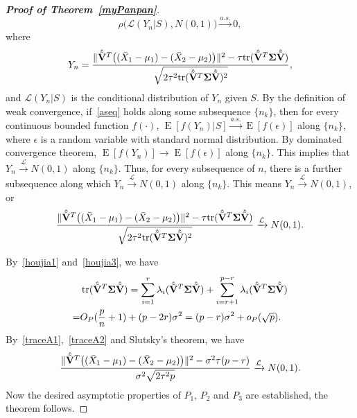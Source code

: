 \documentclass[review]{elsarticle}
\DeclareMathOperator{\mytr}{tr}
\DeclareMathOperator{\myE}{E}
\theoremstyle{plain}
\theoremstyle{definition}
\theoremstyle{remark}
\begin{document}
\begin{proof}[\textbf{Proof of Theorem~\ref{myPanpan}}]
\begin{equation}\label{aseq}
    \rho\big(\mathcal{L}( Y_n |S),N(0,1)\big)\xrightarrow{a.s.}0,
\end{equation}
where 
$$
Y_n=\frac{\|\hat{\tilde{\mathbf{V}}}^T\big((\bar{X}_1-\mu_1)-(\bar{X}_2-\mu_2)\big)\|^2-\tau\mathrm{tr}(\hat{\tilde{\mathbf{V}}}^T\boldsymbol{\Sigma}\hat{\tilde{\mathbf{V}}})}{\sqrt{2\tau^2\mathrm{tr}(\hat{\tilde{\mathbf{V}}}^T\boldsymbol{\Sigma}\hat{\tilde{\mathbf{V}}})^2}},
$$
and $\mathcal{L}(Y_n|S)$ is the conditional distribution of $Y_n$ given $S$.
By the definition of weak convergence,  if~\eqref{aseq} holds along some subsequence $\{n_k\}$, then for every continuous bounded function $f(\cdot)$, $\myE[f(Y_n)|S]\xrightarrow{a.s.}\myE[f(\epsilon)]$ along $\{n_k\}$, where $\epsilon$ is a random variable with standard normal distribution.
By dominated convergence theorem, $\myE[f(Y_n)]\to \myE[f(\epsilon)]$ along $\{n_k\}$.
This implies that $Y_n\xrightarrow{\mathcal{L}}N(0,1)$ along $\{n_k\}$.
Thus, for every subsequence of $n$, there is a further subsequence along which
$Y_n\xrightarrow{\mathcal{L}}N(0,1)$ along $\{n_k\}$.
This means $Y_n\xrightarrow{\mathcal{L}}N(0,1)$, or
$$
\frac{\|\hat{\tilde{\mathbf{V}}}^T\big((\bar{X}_1-\mu_1)-(\bar{X}_2-\mu_2)\big)\|^2-\tau\mathrm{tr}(\hat{\tilde{\mathbf{V}}}^T\boldsymbol{\Sigma}\hat{\tilde{\mathbf{V}}})}{\sqrt{2\tau^2\mathrm{tr}(\hat{\tilde{\mathbf{V}}}^T\boldsymbol{\Sigma}\hat{\tilde{\mathbf{V}}})^2}}\xrightarrow{\mathcal{L}}N(0,1).
$$


By~\eqref{houjia1} and~\eqref{houjia3}, we have
\begin{equation}\label{traceA2}
    \begin{aligned}
        &\mytr(\hat{\tilde{\BV}}^T\bSigma\hat{\tilde{\BV}})=
    \sum_{i=1}^r \lambda_i(\hat{\tilde{\BV}}^T\bSigma\hat{\tilde{\BV}})
    +
    \sum_{i=r+1}^{p-r} \lambda_i(\hat{\tilde{\BV}}^T\bSigma\hat{\tilde{\BV}})\\
        =&
    O_P(\frac{p}{n}+1)+(p-2r)\sigma^2
        =
        (p-r)\sigma^2+o_P(\sqrt{p}).
    \end{aligned}
\end{equation}
By~\eqref{traceA1},~\eqref{traceA2} and Slutsky's theorem, we have
$$
\frac{\|\hat{\tilde{\mathbf{V}}}^T\big((\bar{X}_1-\mu_1)-(\bar{X}_2-\mu_2)\big)\|^2-\sigma^2\tau(p-r) }{\sigma^2\sqrt{2\tau^2 p}}\xrightarrow{\mathcal{L}}N(0,1).
$$
Now the desired asymptotic properties of $P_1$, $P_2$ and $P_3$ are established, the theorem follows.
\end{proof}
\end{document}
